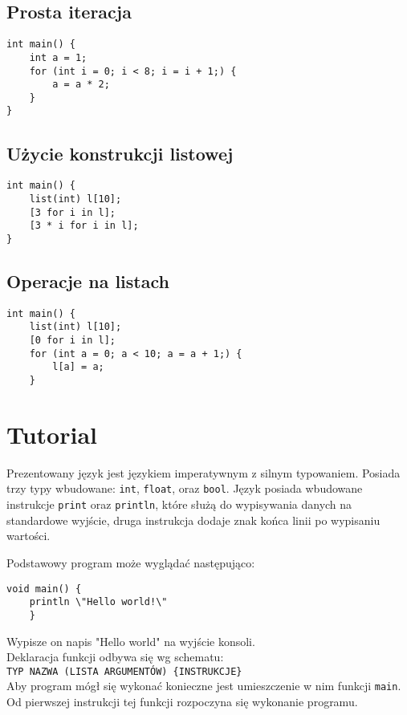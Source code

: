 \documentclass{article}
\begin{document}
\subsection{Prosta iteracja}
\begin{lstlisting}[tabsize=2]
int main() {
	int a = 1;
	for (int i = 0; i < 8; i = i + 1;) {
		a = a * 2;
	}
}
\end{lstlisting}

\subsection{Użycie konstrukcji listowej}
\begin{lstlisting}[tabsize=2]
int main() {
	list(int) l[10];
	[3 for i in l];
	[3 * i for i in l];
}
\end{lstlisting}

\subsection{Operacje na listach}
\begin{lstlisting}[tabsize=2]
int main() {
	list(int) l[10];
	[0 for i in l];
	for (int a = 0; a < 10; a = a + 1;) {
		l[a] = a;
	}
\end{lstlisting}
\newpage

\section{Tutorial}
Prezentowany język jest językiem imperatywnym z silnym typowaniem. Posiada trzy typy wbudowane: \texttt{int}, \texttt{float}, oraz \texttt{bool}.
Język posiada wbudowane instrukcje \texttt{print} oraz \texttt{println}, które służą do wypisywania danych na standardowe wyjście, druga instrukcja dodaje znak końca linii po wypisaniu wartości.

Podstawowy program może wyglądać następująco:
\begin{lstlisting}[tabsize=2]
void main() {
	println \"Hello world!\"
	}
\end{lstlisting}
Wypisze on napis "Hello world" na wyjście konsoli. \\

Deklaracja funkcji odbywa się wg schematu: \\
\texttt{TYP NAZWA (LISTA ARGUMENTÓW) \{INSTRUKCJE\}} \\
Aby program mógł się wykonać konieczne jest umieszczenie w nim funkcji \texttt{main}. Od pierwszej instrukcji tej funkcji rozpoczyna się wykonanie programu.
\end{document}
